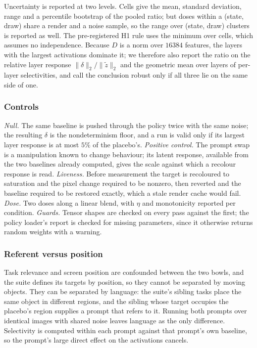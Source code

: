 Uncertainty is reported at two levels. Cells give the mean, standard deviation,
range and a percentile bootstrap of the pooled ratio; but doses within a
(state, draw) share a render and a noise sample, so the range over (state,
draw) clusters is reported as well. The pre-registered H1 rule uses the minimum
over cells, which assumes no independence. Because $D$ is a norm over $16384$
features, the layers with the largest activations dominate it; we therefore
also report the ratio on the relative layer response
$\lVert\delta\rVert_2/\lVert\tilde{z}\rVert_2$ and the geometric mean over
layers of per-layer selectivities, and call the conclusion robust only if all
three lie on the same side of one.

\subsubsection{Controls}
\label{sec:controls}

\emph{Null.} The same baseline is pushed through the policy twice with the same
noise; the resulting $\delta$ is the nondeterminism floor, and a run is valid
only if its largest layer response is at most $5\%$ of the placebo's.
\emph{Positive control.} The prompt swap is a manipulation known to change
behaviour; its latent response, available from the two baselines already
computed, gives the scale against which a recolour response is read.
\emph{Liveness.} Before measurement the target is recoloured to saturation and
the pixel change required to be nonzero, then reverted and the baseline
required to be restored exactly, which a stale render cache would fail.
\emph{Dose.} Two doses along a linear blend, with $\eta$ and monotonicity
reported per condition. \emph{Guards.} Tensor shapes are checked on every pass
against the first; the policy loader's report is checked for missing
parameters, since it otherwise returns random weights with a warning.

\subsubsection{Referent versus position}
\label{sec:grounding}

Task relevance and screen position are confounded between the two bowls, and
the suite defines its targets by position, so they cannot be separated by
moving objects. They can be separated by language: the suite's sibling tasks
place the same object in different regions, and the sibling whose target
occupies the placebo's region supplies a prompt that refers to it. Running both
prompts over identical images with shared noise leaves language as the only
difference. Selectivity is computed within each prompt against that prompt's
own baseline, so the prompt's large direct effect on the activations cancels.

